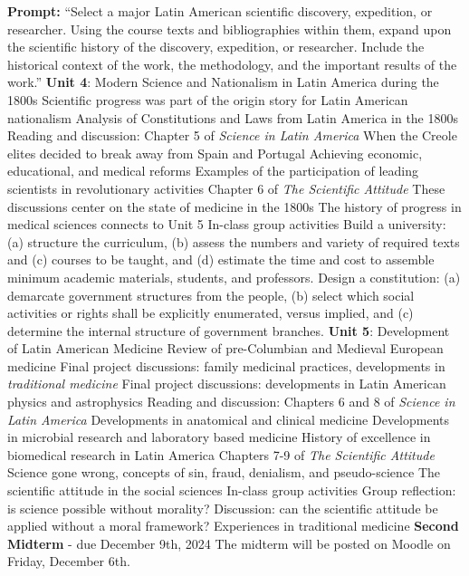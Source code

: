 \documentclass[10pt]{article}
\begin{document}
\begin{outline}[enumerate]
\2 \textbf{Prompt:} ``Select a major Latin American scientific discovery, expedition, or researcher.  Using the course texts and bibliographies within them, expand upon the scientific history of the discovery, expedition, or researcher.  Include the historical context of the work, the methodology, and the important results of the work.''
\1 \textbf{Unit 4}: Modern Science and Nationalism in Latin America during the 1800s
\2 Scientific progress was part of the origin story for Latin American nationalism
\2 Analysis of Constitutions and Laws from Latin America in the 1800s
\2 Reading and discussion:
\3 Chapter 5 of \textit{Science in Latin America}
\4 When the Creole elites decided to break away from Spain and Portugal
\4 Achieving economic, educational, and medical reforms
\4 Examples of the participation of leading scientists in revolutionary activities
\3 Chapter 6 of \textit{The Scientific Attitude}
\4 These discussions center on the state of medicine in the 1800s
\4 The history of progress in medical sciences connects to Unit 5
\2 In-class group activities
\3 Build a university: (a) structure the curriculum, (b) assess the numbers and variety of required texts and (c) courses to be taught, and (d) estimate the time and cost to assemble minimum academic materials, students, and professors.
\3 Design a constitution: (a) demarcate government structures from the people, (b) select which social activities or rights shall be explicitly enumerated, versus implied, and (c) determine the internal structure of government branches.
\1 \textbf{Unit 5}: Development of Latin American Medicine
\2 Review of pre-Columbian and Medieval European medicine
\2 Final project discussions: family medicinal practices, developments in \textit{traditional medicine}
\2 Final project discussions: developments in Latin American physics and astrophysics
\2 Reading and discussion:
\3 Chapters 6 and 8 of \textit{Science in Latin America}
\4 Developments in anatomical and clinical medicine
\4 Developments in microbial research and laboratory based medicine
\4 History of excellence in biomedical research in Latin America
\3 Chapters 7-9 of \textit{The Scientific Attitude}
\4 Science gone wrong, concepts of sin, fraud, denialism, and pseudo-science
\4 The scientific attitude in the social sciences
\2 In-class group activities
\3 Group reflection: is science possible without morality?
\3 Discussion: can the scientific attitude be applied without a moral framework?
\3 Experiences in traditional medicine
\1 \textbf{Second Midterm} - due December 9th, 2024
\2 The midterm will be posted on Moodle on Friday, December 6th.

\end{outline}
\end{document}
